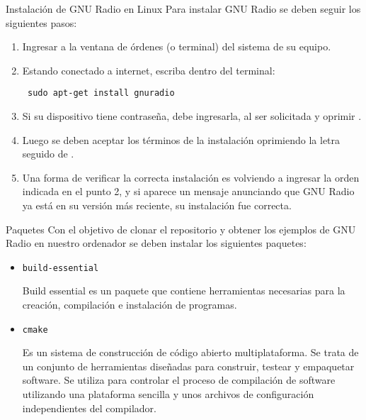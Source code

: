 \begin{frame}{Instalación de GNU Radio en Linux}
{Para instalar GNU Radio se deben seguir los siguientes pasos:}
\begin{enumerate}[1.]
\item Ingresar a la ventana de órdenes (o terminal) del sistema de su equipo.
\item Estando conectado a internet, escriba dentro del terminal:

  \begin{block}{}
  \texttt{ sudo apt-get install gnuradio}
  \end{block}

\item Si su dispositivo tiene contrase\~na, debe ingresarla, al ser solicitada y oprimir \keys{\return}. 
\item Luego se deben aceptar los términos de la instalación oprimiendo la letra  seguido de \keys{\return}. 
\item Una forma de verificar la correcta instalación es volviendo a ingresar la orden indicada en el punto 2, y si aparece un mensaje anunciando que GNU Radio ya está en su versión más reciente, su instalación fue correcta.
\end{enumerate}
\end{frame}

\begin{frame}{Paquetes}
Con el objetivo de clonar el repositorio y obtener los ejemplos de GNU Radio en nuestro ordenador se deben instalar los siguientes paquetes: 
  \begin{itemize}
  \item {\tt build-essential}

    Build essential es un paquete que contiene herramientas necesarias
    para la creación, compilación e instalación de programas.
  
  \item {\tt cmake}

  Es un sistema de construcción de código abierto multiplataforma. Se trata de
un conjunto de herramientas diseñadas para construir, testear y empaquetar
software. Se utiliza para controlar el proceso de compilación de software
utilizando una plataforma sencilla y unos archivos de configuración
independientes del compilador.

  \end{itemize}

\end{frame}

